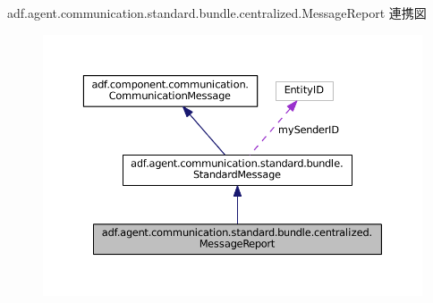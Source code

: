 adf.\+agent.\+communication.\+standard.\+bundle.\+centralized.\+Message\+Report 連携図
\nopagebreak
\begin{figure}[H]
\begin{center}
\leavevmode
\includegraphics[width=350pt]{classadf_1_1agent_1_1communication_1_1standard_1_1bundle_1_1centralized_1_1MessageReport__coll__graph}
\end{center}
\end{figure}
